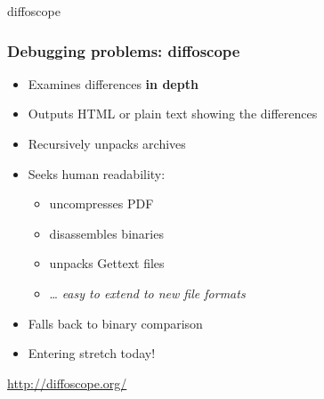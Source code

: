 \documentclass[14pt]{beamer}
\begin{document}
{
\begin{frame}{diffoscope}
 \frametitle{Debugging problems: diffoscope}

 \begin{itemize}
  \item Examines differences \textbf{in depth}
  \item Outputs HTML or plain text showing the differences
  \item Recursively unpacks archives
  \item Seeks human readability:
   \begin{itemize}
    \item uncompresses PDF
    \item disassembles binaries
    \item unpacks Gettext files
    \item … \textit{easy to extend to new file formats}
   \end{itemize}
  \item Falls back to binary comparison
  \item Entering stretch today!
 \end{itemize}
 \vfill
 \begin{center}
  \url{http://diffoscope.org/}\\
  {\footnotesize {}}
 \end{center}
\end{frame}
}
\end{document}

